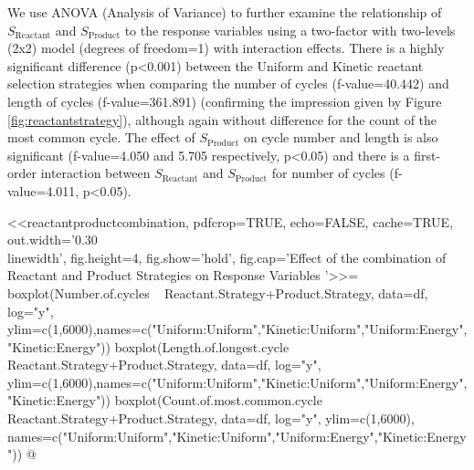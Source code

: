 We use ANOVA (Analysis of Variance) to further examine the relationship of $S_\mathrm{Reactant}$ and $S_\mathrm{Product}$ to the response variables using a two-factor with two-levels (2x2) model (degrees of freedom=1) with interaction effects. There is a highly significant difference (p\textless 0.001) between the Uniform and Kinetic reactant selection strategies when comparing the number of cycles (f-value=40.442) and length of cycles (f-value=361.891) (confirming the impression given by Figure \cref{fig:reactantstrategy}), although again without difference for the count of the most common cycle. The effect of $S_\mathrm{Product}$ on cycle number and length is also significant (f-value=4.050 and 5.705 respectively, p\textless 0.05) and there is a first-order interaction between $S_\mathrm{Reactant}$ and $S_\mathrm{Product}$ for number of cycles (f-value=4.011, p\textless 0.05).

<<reactantproductcombination, pdfcrop=TRUE, echo=FALSE, cache=TRUE, out.width='0.30\\linewidth', fig.height=4, fig.show='hold', fig.cap='Effect of the combination of Reactant and Product Strategies on Response Variables '>>=
boxplot(Number.of.cycles ~ Reactant.Strategy+Product.Strategy, data=df,  log="y", ylim=c(1,6000),names=c("Uniform:Uniform","Kinetic:Uniform","Uniform:Energy","Kinetic:Energy"))
boxplot(Length.of.longest.cycle ~ Reactant.Strategy+Product.Strategy, data=df,  log="y", ylim=c(1,6000),names=c("Uniform:Uniform","Kinetic:Uniform","Uniform:Energy","Kinetic:Energy"))
boxplot(Count.of.most.common.cycle ~ Reactant.Strategy+Product.Strategy, data=df, log="y", ylim=c(1,6000), names=c("Uniform:Uniform","Kinetic:Uniform","Uniform:Energy","Kinetic:Energy"))
@


